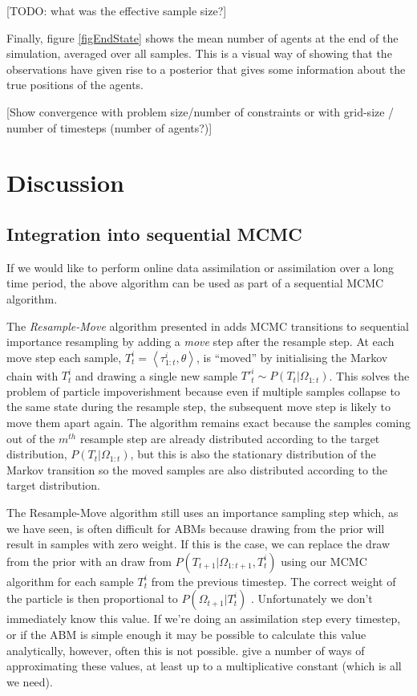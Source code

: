 \documentclass{article}
\begin{document}
[TODO: what was the effective sample size?]

Finally, figure \ref{figEndState} shows the mean number of agents at the end of the simulation, averaged over all samples. This is a visual way of showing that the observations have given rise to a posterior that gives some information about the true positions of the agents.

[Show convergence with problem size/number of constraints or with grid-size / number of timesteps (number of agents?)]

\section{Discussion} 
\label{discussion}

 
\subsection{Integration into sequential MCMC}

If we would like to perform online data assimilation or assimilation over a long time period, the above algorithm can be used as part of a sequential MCMC algorithm.

The \textit{Resample-Move} algorithm presented in \citet{gilks2001following} adds MCMC transitions to sequential importance resampling by adding a \textit{move} step after the resample step. At each move step each sample, $T^i_t = \left<\tau_{1:t}^i,\theta\right>$, is ``moved'' by initialising the Markov chain with $T^i_t$ and drawing a single new sample $T'^{i}_{t} \sim P(T_t|\Omega_{1:t})$. This solves the problem of particle impoverishment because even if multiple samples collapse to the same state during the resample step, the subsequent move step is likely to move them apart again. The algorithm remains exact because the samples coming out of the $m^{th}$ resample step are already distributed according to the target distribution, $P(T_t|\Omega_{1:t})$, but this is also the stationary distribution of the Markov transition so the moved samples are also distributed according to the target distribution.

The Resample-Move algorithm still uses an importance sampling step which, as we have seen, is often difficult for ABMs because drawing from the prior will result in samples with zero weight. If this is the case, we can replace the draw from the prior with an draw from $P(T_{t+1}|\Omega_{1:{t+1}},T^i_t)$ using our MCMC algorithm for each sample $T^i_t$ from the previous timestep. The correct weight of the particle is then proportional to $P(\Omega_{t+1}|T^i_t)$ \citep{doucet2009tutorial}. Unfortunately we don't immediately know this value. If we're doing an assimilation step every timestep, or if the ABM is simple enough it may be possible to calculate this value analytically, however, often this is not possible.   \citet*{han2001markov, newton1994approximate, stefankovic2009adaptive} give a number of ways of approximating these values, at least up to a multiplicative constant (which is all we need).
\end{document}
